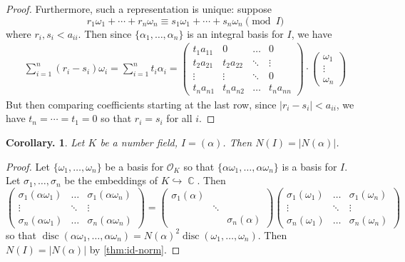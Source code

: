 \documentclass[11pt, a4paper]{memoir}
\DeclareMathOperator{\C}{{\mathbb{C}}}
\newcommand{\hto}[0]{\ensuremath{\hookrightarrow}}
\theoremstyle{change}
\newtheorem{corollary}[theorem]{Corollary.}
\theoremstyle{plain}
\theoremstyle{nonumberplain}
\newtheorem{proof}{Proof}
\DeclareMathOperator{\disc}{disc}
\numberwithin{equation}{section}
\begin{document}
\begin{proof}
    Furthermore, such a representation is unique: suppose
    \begin{equation*}
        r_1\omega_1+\cdots+r_n\omega_n\equiv s_1\omega_1+\cdots+s_n\omega_n\pmod{I}
    \end{equation*}
    where $r_i,s_i<a_{ii}$.
    Then since $\{\alpha_1,\ldots,\alpha_n\}$ is an integral basis for $I$, we have
    \begin{align*}
        \sum_{i=1}^n(r_i-s_i)\omega_i = \sum_{i=1}^n t_i\alpha_i = 
        \begin{pmatrix}
            t_1a_{11}&0&\hdots&0\\
            t_2a_{21}&t_2a_{22}&\ddots&\vdots\\
            \vdots&\vdots&\ddots&0\\
            t_na_{n1}&t_na_{n2}&\hdots&t_na_{nn}
        \end{pmatrix}\cdot
        \begin{pmatrix}
            \omega_1\\\vdots\\\omega_n
        \end{pmatrix}
    \end{align*}
    But then comparing coefficients starting at the last row, since $|r_i-s_i|<a_{ii}$, we have $t_n=\cdots=t_1=0$ so that $r_i=s_i$ for all $i$.
\end{proof}
\begin{corollary}
    Let $K$ be a number field, $I=(\alpha)$.
    Then $N(I)=|N(\alpha)|$.
\end{corollary}
\begin{proof}
    Let $\{\omega_1,\ldots,\omega_n\}$ be a basis for $\mathcal{O}_K$ so that $\{\alpha\omega_1,\ldots,\alpha\omega_n\}$ is a basis for $I$.
    Let $\sigma_1,\ldots,\sigma_n$ be the embeddings of $K\hto\C$.
    Then
    \begin{equation*}
        \begin{pmatrix}
            \sigma_1(\alpha\omega_1) &\hdots&\sigma_1(\alpha\omega_n)\\
            \vdots&\ddots&\vdots\\
            \sigma_n(\alpha\omega_1) &\hdots&\sigma_n(\alpha\omega_n)
        \end{pmatrix}
        =
        \begin{pmatrix}
            \sigma_1(\alpha) &&\\
                             &\ddots&\\
                             &&\sigma_n(\alpha)
        \end{pmatrix}
        \begin{pmatrix}
            \sigma_1(\omega_1) &\hdots&\sigma_1(\omega_n)\\
            \vdots&\ddots&\vdots\\
            \sigma_n(\omega_1) &\hdots&\sigma_n(\omega_n)
        \end{pmatrix}
    \end{equation*}
    so that $\disc(\alpha\omega_1,\ldots,\alpha\omega_n)=N(\alpha)^2\disc(\omega_1,\ldots,\omega_n)$.
    Then $N(I)=|N(\alpha)|$ by \cref{thm:id-norm}.
\end{proof}
\end{document}
